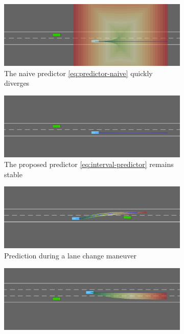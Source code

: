 \begin{figure}
	\begin{center}
	\begin{subfigure}[b]{0.75\linewidth}
		\centering
		\includegraphics[width=\textwidth]{img/driving_observer.png}
		\caption{The naive predictor \eqref{eq:predictor-naive} quickly diverges}
		\label{sub:hw-a}
	\end{subfigure}
	\begin{subfigure}[b]{0.75\linewidth}
		\centering
		\includegraphics[width=\textwidth]{img/driving_predictor.png}
		\caption{The proposed predictor \eqref{eq:interval-predictor} remains stable}
		\label{sub:hw-b}
	\end{subfigure}
	\begin{subfigure}[b]{0.75\linewidth}
		\centering
		\includegraphics[width=\textwidth]{img/lane_change_predictor.png}
		\caption{Prediction during a lane change maneuver}
		\label{sub:hw-c}
	\end{subfigure}
	\begin{subfigure}[b]{0.75\linewidth}
		\centering
		\includegraphics[width=\textwidth]{img/overtake.png}

\end{subfigure}
\end{center}
\end{figure}

